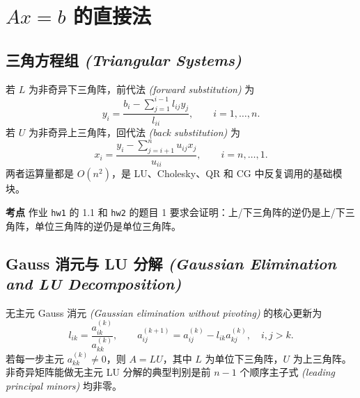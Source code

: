 \documentclass{article}
\newcommand{\exam}{\textcolor{red!65!black}{\textbf{考点}}}
\newcommand{\eng}[1]{\texorpdfstring{{\normalfont\rmfamily\itshape\textcolor{blue!65!black}{(#1)}}}{(#1)}}
\begin{document}
\section{\texorpdfstring{$Ax=b$}{Ax=b} 的直接法}

\subsection{三角方程组 \eng{Triangular Systems}}

若 $L$ 为非奇异下三角阵，前代法 \eng{forward substitution} 为
\[
  y_i = \frac{b_i-\sum_{j=1}^{i-1} l_{ij}y_j}{l_{ii}}, \qquad i=1,\dots,n.
\]
若 $U$ 为非奇异上三角阵，回代法 \eng{back substitution} 为
\[
  x_i = \frac{y_i-\sum_{j=i+1}^{n}u_{ij}x_j}{u_{ii}}, \qquad i=n,\dots,1.
\]
两者运算量都是 $O(n^2)$，是 LU、Cholesky、QR 和 CG 中反复调用的基础模块。

\begin{algorithm}[H]
  \caption{下三角矩阵求逆 \eng{Inverse of a Lower Triangular Matrix}}
\end{algorithm}

\exam{} 作业 \texttt{hw1} 的 1.1 和 \texttt{hw2} 的题目 1 要求会证明：上/下三角阵的逆仍是上/下三角阵，单位三角阵的逆仍是单位三角阵。

\subsection{Gauss 消元与 LU 分解 \eng{Gaussian Elimination and LU Decomposition}}

无主元 Gauss 消元 \eng{Gaussian elimination without pivoting} 的核心更新为
\[
  l_{ik}=\frac{a_{ik}^{(k)}}{a_{kk}^{(k)}}, \qquad
  a_{ij}^{(k+1)}=a_{ij}^{(k)}-l_{ik}a_{kj}^{(k)},\quad i,j>k.
\]
若每一步主元 $a_{kk}^{(k)}\ne0$，则 $A=LU$，其中 $L$ 为单位下三角阵，$U$ 为上三角阵。
非奇异矩阵能做无主元 LU 分解的典型判别是前 $n-1$ 个顺序主子式
\eng{leading principal minors} 均非零。

\begin{algorithm}[H]
  \caption{原地 LU 分解（无主元）\eng{In-place LU Factorization without Pivoting}}
\end{algorithm}
\end{document}
